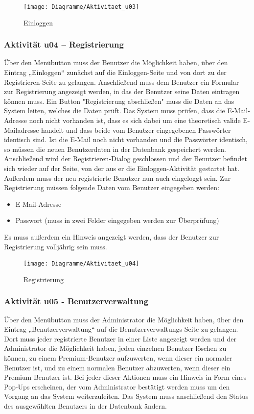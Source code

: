 \documentclass[a4paper,12pt,oneside]{scrartcl}
\begin{document}
\begin{figure}[!htbp]
\centering
\noindent\texttt{[image: Diagramme/Aktivitaet\_u03]}
\caption{Einloggen}
\end{figure}
\FloatBarrier


\subsubsection{Aktivität u04 – Registrierung}
Über den Menübutton muss der Benutzer die Möglichkeit haben, über den Eintrag „Einloggen“ zunächst auf die Einloggen-Seite und von dort zu der Registrieren-Seite zu gelangen.
Anschließend muss dem Benutzer ein Formular zur Registrierung angezeigt werden, in das der Benutzer seine Daten eintragen können muss.
Ein Button "Registrierung abschließen" muss die Daten an das System leiten, welches die Daten prüft.
Das System muss prüfen, dass die E-Mail-Adresse noch nicht vorhanden ist, dass es sich dabei um eine theoretisch valide E-Mailadresse handelt und dass beide vom Benutzer eingegebenen Passwörter identisch sind.
Ist die E-Mail noch nicht vorhanden und die Passwörter identisch, so müssen die neuen Benutzerdaten in der Datenbank gespeichert werden. Anschließend wird der Registrieren-Dialog geschlossen und der Benutzer befindet sich wieder auf der Seite, von der aus er die Einloggen-Aktivität gestartet hat.
Außerdem muss der neu registrierte Benutzer nun auch eingeloggt sein.
Zur Registrierung müssen folgende Daten vom Benutzer eingegeben werden:
\begin{itemize}
	\item E-Mail-Adresse
	\item Passwort (muss in zwei Felder eingegeben werden zur Überprüfung)
\end{itemize}
Es muss außerdem ein Hinweis angezeigt werden, dass der Benutzer zur Registrierung volljährig sein muss.

\begin{figure}[!htbp]
\centering
\noindent\texttt{[image: Diagramme/Aktivitaet\_u04]}
\caption{Registrierung}
\end{figure}
\FloatBarrier




\subsubsection{Aktivität u05 - Benutzerverwaltung}
Über den Menübutton muss der Administrator die Möglichkeit haben, über den Eintrag „Benutzerverwaltung“ auf die Benutzerverwaltungs-Seite zu gelangen.
Dort muss jeder registrierte Benutzer in einer Liste angezeigt werden und der Administrator die Möglichkeit haben, jeden einzelnen Benutzer löschen zu können, zu einem Premium-Benutzer aufzuwerten, wenn dieser ein normaler Benutzer ist, und zu einem normalen Benutzer abzuwerten, wenn dieser ein Premium-Benutzer ist.
Bei jeder dieser Aktionen muss ein Hinweis in Form eines Pop-Ups erscheinen, der vom Administrator bestätigt werden muss um den Vorgang an das System weiterzuleiten.
Das System muss anschließend den Status des ausgewählten Benutzers in der Datenbank ändern.
\end{document}
